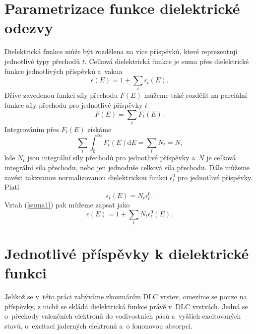 \section{Parametrizace funkce dielektrické odezvy}
Dielektrická funkce může být rozdělena na více příspěvků, které reprezentují jednotlivé typy přechodů $t$. Celková dielektrická funkce je suma přes dielektrické funkce jednotlivých příspěvků a~vakua \cite{sumrule}
\begin{equation}
\epsilon(E) = 1 + \sum_t \epsilon_t(E) \text{.}
\label{suma1}
\end{equation}
%
Dříve zavedenou funkci síly přechodu $F(E)$ můžeme také rozdělit na parciální funkce síly přechodu pro jednotlivé příspěvky $t$
\begin{equation}
F(E) = \sum_t F_t(E) \text{.}
\end{equation}
Integrováním přes $F_t(E)$ získáme 
\begin{equation}
\label{definiceceelkovesily}
\sum_t \int_0^\infty F_t(E)\mathrm{d}E = \sum_t N_t = N \text{,}
\end{equation}
kde $N_t$ jsou integrální síly přechodů pro jednotlivé příspěvky a~$N$ je celková integrální síla přechodu, nebo jen jednoduše celková síla přechodu.  
%
Dále můžeme zavést takzvanou normalizovanou dielektrickou funkci $\epsilon_t^0$ pro jednotlivé příspěvky. Platí 
\begin{equation}
\epsilon_t(E) = N_t \epsilon_t^0  \text{.}
\end{equation}
%
Vztah (\ref{suma1}) pak můžeme zapsat jako
\begin{equation}
\epsilon (E) = 1 + \sum_t N_t \epsilon_t^0(E) \text{.}
\end{equation}




\section{Jednotlivé příspěvky k dielektrické funkci}
Jelikož se v~této práci zabýváme zkoumáním DLC vrstev, omezíme se pouze na příspěvky, z nichž se skládá dielektrická funkce právě v~DLC vrstvách. Jedná se o~přechody valenčních elektronů do vodivostních pásů a~vyšších excitovaných stavů, o~excitaci jaderných elektronů a~o fononovou absorpci. 

